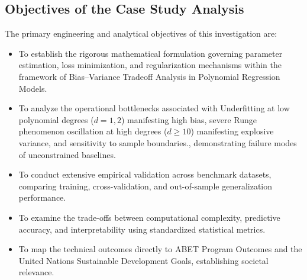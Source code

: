 \subsection{Objectives of the Case Study Analysis}
The primary engineering and analytical objectives of this investigation are:
\begin{itemize}
  \item To establish the rigorous mathematical formulation governing parameter estimation, loss minimization, and regularization mechanisms within the framework of Bias--Variance Tradeoff Analysis in Polynomial Regression Models.
  \item To analyze the operational bottlenecks associated with Underfitting at low polynomial degrees ($d=1, 2$) manifesting high bias, severe Runge phenomenon oscillation at high degrees ($d \ge 10$) manifesting explosive variance, and sensitivity to sample boundaries., demonstrating failure modes of unconstrained baselines.
  \item To conduct extensive empirical validation across benchmark datasets, comparing training, cross-validation, and out-of-sample generalization performance.
  \item To examine the trade-offs between computational complexity, predictive accuracy, and interpretability using standardized statistical metrics.
  \item To map the technical outcomes directly to ABET Program Outcomes and the United Nations Sustainable Development Goals, establishing societal relevance.
\end{itemize}
